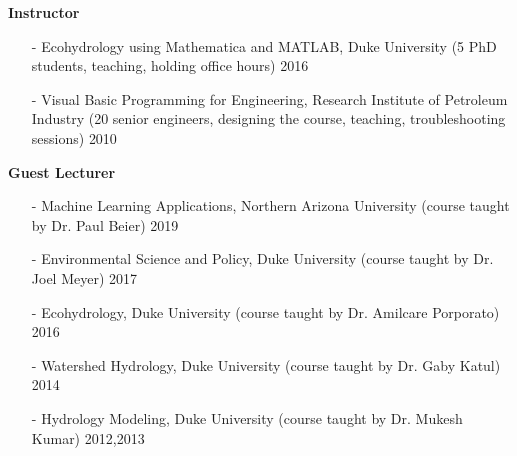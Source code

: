 \documentclass[10pt]{article}
\newenvironment{changemargin}[2]{%
  \begin{list}{}{%
 \setlength{\topsep}{0pt}%
 \setlength{\leftmargin}{#1}%
 \setlength{\rightmargin}{#2}%
 \setlength{\listparindent}{\parindent}%
 \setlength{\itemindent}{\parindent}%
 \setlength{\parsep}{\parskip}%
  }%
  \item[]}{\end{list}
}
\newenvironment{body} {
  \vspace*{-2pt}
  \begin{changemargin}{-0.5in}{-0.5in}
}
{\end{changemargin}
}
\begin{document}
\begin{body}
  \textbf {Instructor}\\
  \vspace*{-4pt}
  \begin{itemize} \itemsep -0pt
    \item[-]Ecohydrology using Mathematica and MATLAB, Duke University (5 PhD students, teaching, holding office hours) \hfill {2016}
    \item[-]Visual Basic Programming for Engineering, Research Institute of Petroleum Industry (20 senior engineers, designing the course, teaching,  troubleshooting sessions)  \hfill {2010}
  \end{itemize}
  \medskip

  \textbf {Guest Lecturer}\\
  \vspace*{-4pt}
  \begin{itemize} \itemsep -0pt
    \item[-]Machine Learning Applications, Northern Arizona University  (course taught by Dr. Paul Beier) \hfill {2019}
    \item[-]Environmental Science and Policy, Duke University (course taught by Dr. Joel Meyer)  \hfill {2017}
    \item[-]Ecohydrology, Duke University (course taught by Dr. Amilcare Porporato)  \hfill {2016}
    \item[-]Watershed Hydrology, Duke University (course taught by Dr. Gaby Katul)  \hfill {2014}
    \item[-]Hydrology Modeling, Duke University (course taught by Dr. Mukesh Kumar)  \hfill {2012,2013}
  \end{itemize}
  \medskip



\end{body}
\end{document}
